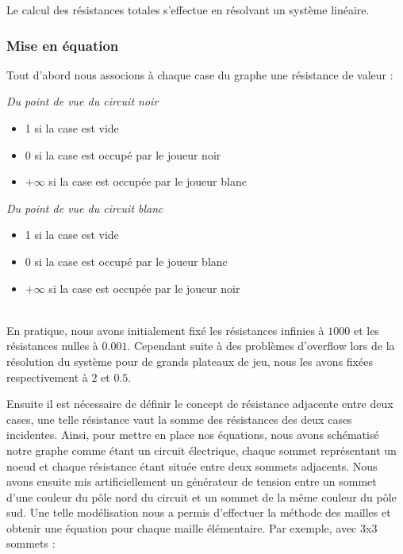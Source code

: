 \documentclass{article}
\begin{document}
Le calcul des résistances totales s'effectue en résolvant un système linéaire.

\subsubsection{Mise en équation}
Tout d'abord nous associons à chaque case du graphe une résistance de valeur : 
\vspace{4pt}

\noindent\textit{Du point de vue du circuit noir}
\vspace{4pt}

\begin{itemize}
    \item 1 si la case est vide
    \item 0 si la case est occupé par le joueur noir
    \item $+\infty$ si la case est occupée par le joueur blanc
\end{itemize}
\vspace{4pt}

\noindent\textit{Du point de vue du circuit blanc}
\begin{itemize}
    \item 1 si la case est vide
    \item 0 si la case est occupé par le joueur blanc
    \item $+\infty$ si la case est occupée par le joueur noir
\end{itemize}

\ \\
\indent En pratique, nous avons initialement fixé les résistances infinies à $1000$ et les résistances nulles à $0.001$. Cependant suite à des problèmes d'overflow lors de la résolution du système pour de grands plateaux de jeu, nous les avons fixées respectivement à $2$ et $0.5$.
\vspace{4pt}

Ensuite il est nécessaire de définir le concept de résistance adjacente entre deux cases, une telle résistance vaut la somme des résistances des deux cases incidentes.
Ainsi, pour mettre en place nos équations, nous avons schématisé notre graphe comme étant un circuit électrique, chaque sommet représentant un noeud et chaque résistance étant située entre deux sommets adjacents. Nous avons ensuite mis artificiellement un générateur de tension entre un sommet d'une couleur du pôle nord du circuit et un sommet de la même couleur du pôle sud. Une telle modélisation nous a permis d'effectuer la méthode des mailles et obtenir une équation pour chaque maille élémentaire.
Par exemple, avec 3x3 sommets :
\end{document}
